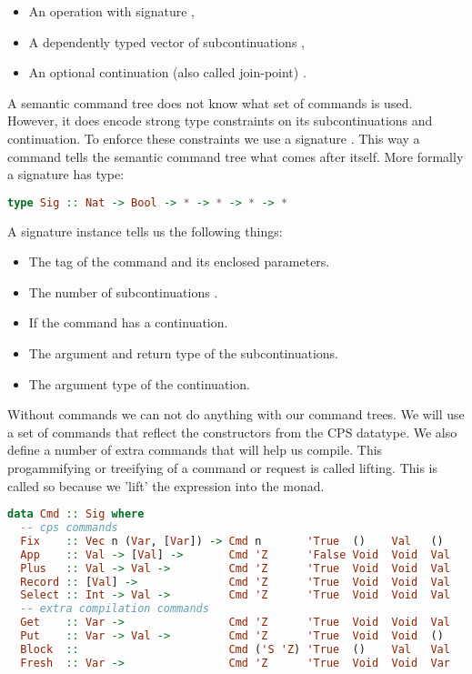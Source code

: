\begin{itemize}
\item An operation  with signature ,
\item A dependently typed vector of subcontinuations ,
\item An optional continuation (also called join-point) .
\end{itemize}

A semantic command tree does not know what set of commands is used. However, it does encode strong type constraints on its subcontinuations and continuation. To enforce these constraints we use a signature . This way a command tells the semantic command tree what comes after itself. More formally a signature has type:

\begin{lstlisting}[language=Haskell]
type Sig :: Nat -> Bool -> * -> * -> * -> *
\end{lstlisting}

A signature instance  tells us the following things:

\begin{itemize}
\item The tag of the command and its enclosed parameters.
\item The number of subcontinuations .
\item If the command has a continuation.
\item The argument  and return type  of the subcontinuations.
\item The argument type  of the continuation.
\end{itemize}

Without commands we can not do anything with our command trees. We will use a set of commands that reflect the constructors from the \ac{CPS} datatype. We also define a number of extra commands that will help us compile. This progammifying or treeifying of a command or request is called lifting. This is called so because we 'lift' the expression into the monad.

\begin{lstlisting}[language=Haskell]
data Cmd :: Sig where
  -- cps commands
  Fix    :: Vec n (Var, [Var]) -> Cmd n       'True  ()    Val   ()
  App    :: Val -> [Val] ->       Cmd 'Z      'False Void  Void  Val 
  Plus   :: Val -> Val ->         Cmd 'Z      'True  Void  Void  Val
  Record :: [Val] ->              Cmd 'Z      'True  Void  Void  Val
  Select :: Int -> Val ->         Cmd 'Z      'True  Void  Void  Val
  -- extra compilation commands
  Get    :: Var ->                Cmd 'Z      'True  Void  Void  Val
  Put    :: Var -> Val ->         Cmd 'Z      'True  Void  Void  ()
  Block  ::                       Cmd ('S 'Z) 'True  ()    Val   Val
  Fresh  :: Var ->                Cmd 'Z      'True  Void  Void  Var
\end{lstlisting}

